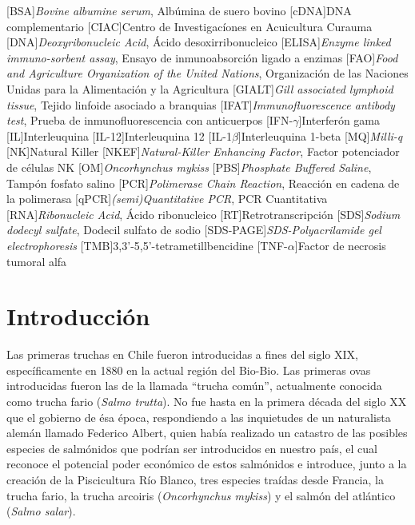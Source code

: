 \documentclass[12pt,letterpaper,oneside]{scrbook}
\begin{document}
\begin{acronym}
    [BSA]{\emph{Bovine albumine serum}, Albúmina de suero bovino}
    [cDNA]{DNA complementario}
    [CIAC]{Centro de Investigacíones en Acuicultura Curauma}
    [DNA]{\emph{Deoxyribonucleic Acid}, Ácido desoxirribonucleico}
    [ELISA]{\emph{Enzyme linked immuno-sorbent assay}, Ensayo de inmunoabsorción ligado a enzimas}
    [FAO]{\emph{Food and Agriculture Organization of the United Nations}, Organización de las Naciones Unidas para la Alimentación y la Agricultura}
    [GIALT]{\emph{Gill associated lymphoid tissue}, Tejido linfoide asociado a branquias}
    [IFAT]{\emph{Immunofluorescence antibody test}, Prueba de inmunofluorescencia con anticuerpos}
    [IFN-$\gamma$]{Interferón gama}
    [IL]{Interleuquina}
    [IL-12]{Interleuquina 12}
    [IL-1$\beta$]{Interleuquina 1-beta}
    [MQ]{\emph{Milli-q}}
    [NK]{Natural Killer}
    [NKEF]{\emph{Natural-Killer Enhancing Factor}, Factor potenciador de células NK}
    [OM]{\emph{Oncorhynchus mykiss}}
    [PBS]{\emph{Phosphate Buffered Saline}, Tampón fosfato salino}
    [PCR]{\emph{Polimerase Chain Reaction}, Reacción en cadena de la polimerasa}
    [qPCR]{\emph{(semi)Quantitative PCR}}, PCR Cuantitativa
    [RNA]{\emph{Ribonucleic Acid}, Ácido ribonucleico}
    [RT]{Retrotranscripción}
    [SDS]{\emph{Sodium dodecyl sulfate}, Dodecil sulfato de sodio}
    [SDS-PAGE]{\emph{SDS-Polyacrilamide gel electrophoresis}}
    [TMB]{3,3'-5,5'-tetrametillbencidine}
    [TNF-$\alpha$]{Factor de necrosis tumoral alfa}
    \end{acronym}

\clearpage
\listoffigures
\cleardoublepage
\listoftables

\mainmatter
\chapter{Introducción}\label{cap.introduccion}

Las primeras truchas en Chile fueron introducidas a fines del siglo XIX,
específicamente en 1880 en la actual región del Bio-Bio. Las primeras
ovas introducidas fueron las de la llamada ``trucha común'', actualmente
conocida como trucha fario (\emph{Salmo trutta}). No fue hasta en la
primera década del siglo XX que el gobierno de ésa época, respondiendo a
las inquietudes de un naturalista alemán llamado Federico Albert, quien
había realizado un catastro de las posibles especies de salmónidos que
podrían ser introducidos en nuestro país, el cual reconoce el potencial
poder económico de estos salmónidos e introduce, junto a la creación de
la Piscicultura Río Blanco, tres especies traídas desde Francia, la
trucha fario, la trucha arcoiris (\emph{Oncorhynchus mykiss}) y el
salmón del atlántico (\emph{Salmo salar}).
\end{document}

